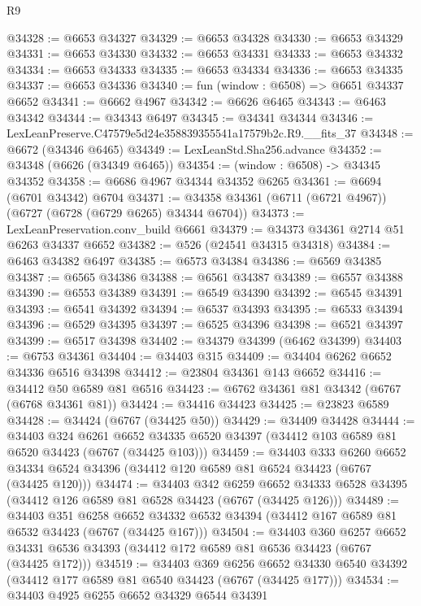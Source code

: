 \begin{lexlean}{R9}
\begin{coremodule}
@34328 := @6653 @34327
@34329 := @6653 @34328
@34330 := @6653 @34329
@34331 := @6653 @34330
@34332 := @6653 @34331
@34333 := @6653 @34332
@34334 := @6653 @34333
@34335 := @6653 @34334
@34336 := @6653 @34335
@34337 := @6653 @34336
@34340 := fun (window : @6508) => @6651 @34337 @6652
@34341 := @6662 @4967
@34342 := @6626 @6465
@34343 := @6463 @34342
@34344 := @34343 @6497
@34345 := @34341 @34344
@34346 := LexLeanPreserve.C47579e5d24e358839355541a17579b2c.R9.__fits_37
@34348 := @6672 (@34346 @6465)
@34349 := LexLeanStd.Sha256.advance
@34352 := @34348 (@6626 (@34349 @6465))
@34354 := (window : @6508) -> @34345 @34352
@34358 := @6686 @4967 @34344 @34352 @6265
@34361 := @6694 (@6701 @34342) @6704
@34371 := @34358 @34361 (@6711 (@6721 @4967)) (@6727 (@6728 (@6729 @6265) @34344 @6704))
@34373 := LexLeanPreservation.conv_build @6661
@34379 := @34373 @34361 @2714 @51 @6263 @34337 @6652
@34382 := @526 (@24541 @34315 @34318)
@34384 := @6463 @34382 @6497
@34385 := @6573 @34384
@34386 := @6569 @34385
@34387 := @6565 @34386
@34388 := @6561 @34387
@34389 := @6557 @34388
@34390 := @6553 @34389
@34391 := @6549 @34390
@34392 := @6545 @34391
@34393 := @6541 @34392
@34394 := @6537 @34393
@34395 := @6533 @34394
@34396 := @6529 @34395
@34397 := @6525 @34396
@34398 := @6521 @34397
@34399 := @6517 @34398
@34402 := @34379 @34399 (@6462 @34399)
@34403 := @6753 @34361
@34404 := @34403 @315
@34409 := @34404 @6262 @6652 @34336 @6516 @34398
@34412 := @23804 @34361 @143 @6652
@34416 := @34412 @50 @6589 @81 @6516
@34423 := @6762 @34361 @81 @34342 (@6767 (@6768 @34361 @81))
@34424 := @34416 @34423
@34425 := @23823 @6589
@34428 := @34424 (@6767 (@34425 @50))
@34429 := @34409 @34428
@34444 := @34403
    @324
    @6261
    @6652
    @34335
    @6520
    @34397
    (@34412 @103 @6589 @81 @6520 @34423 (@6767 (@34425 @103)))
@34459 := @34403
    @333
    @6260
    @6652
    @34334
    @6524
    @34396
    (@34412 @120 @6589 @81 @6524 @34423 (@6767 (@34425 @120)))
@34474 := @34403
    @342
    @6259
    @6652
    @34333
    @6528
    @34395
    (@34412 @126 @6589 @81 @6528 @34423 (@6767 (@34425 @126)))
@34489 := @34403
    @351
    @6258
    @6652
    @34332
    @6532
    @34394
    (@34412 @167 @6589 @81 @6532 @34423 (@6767 (@34425 @167)))
@34504 := @34403
    @360
    @6257
    @6652
    @34331
    @6536
    @34393
    (@34412 @172 @6589 @81 @6536 @34423 (@6767 (@34425 @172)))
@34519 := @34403
    @369
    @6256
    @6652
    @34330
    @6540
    @34392
    (@34412 @177 @6589 @81 @6540 @34423 (@6767 (@34425 @177)))
@34534 := @34403
    @4925
    @6255
    @6652
    @34329
    @6544
    @34391

\end{coremodule}
\end{lexlean}

